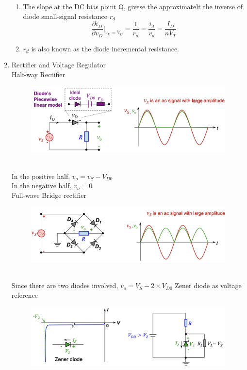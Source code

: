 \documentclass{article}
\begin{document}
\begin{enumerate}
\begin{enumerate}
        \item The slope at the DC bias point Q, givese the approximatelt the inverse of diode small-signal resistance $r_d$
        \[\frac{\partial i_D}{\partial v_D} \bigg|_{v_D = V_D} = \frac{1}{r_d} = \frac{i_d}{v_d} = \frac{I_D}{nV_T}\]
        \item $r_d$ is also known as the diode incremental resistance.
    \end{enumerate}
    \item Rectifier and Voltage Regulator\\
    Half-way Rectifier\\
    \begin{figure}[h]
        \centering
        \includegraphics[width=1\linewidth]{image/halfrect.png}
    \end{figure} \\
    In the positive half, \(v_o = v_S -V_{D0}\) \\
    In the negative half, \(v_o = 0\) \\
    Full-wave Bridge rectifier\\
    \begin{figure}[h]
        \centering
        \includegraphics[width=1\linewidth]{image/fullwavebridge.png}
    \end{figure} \\
    Since there are two diodes involved, \(v_o = V_S - 2\times V_{D0}\) 
    \newpage
    Zener diode as voltage reference
    \begin{figure}[h]
        \centering
        \includegraphics[width=1\linewidth]{image/zener.png}

\end{figure}
\end{enumerate}
\end{document}

